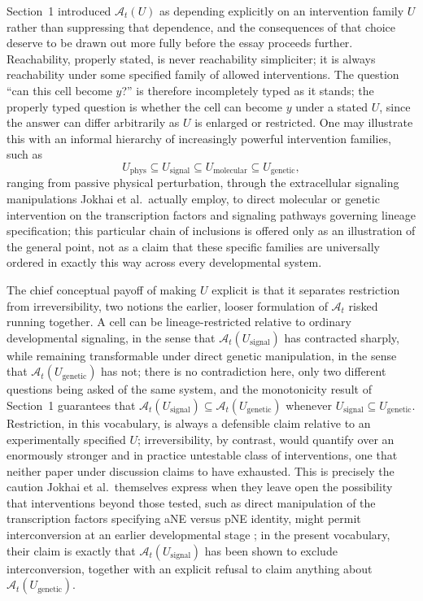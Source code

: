 \documentclass[11pt]{article}
\begin{document}
Section~1 introduced $\mathcal{A}_t(U)$ as depending explicitly on an intervention family $U$ rather than suppressing that dependence, and the consequences of that choice deserve to be drawn out more fully before the essay proceeds further. Reachability, properly stated, is never reachability simpliciter; it is always reachability under some specified family of allowed interventions. The question ``can this cell become $y$?'' is therefore incompletely typed as it stands; the properly typed question is whether the cell can become $y$ under a stated $U$, since the answer can differ arbitrarily as $U$ is enlarged or restricted. One may illustrate this with an informal hierarchy of increasingly powerful intervention families, such as
\begin{equation}
U_{\text{phys}} \subseteq U_{\text{signal}} \subseteq U_{\text{molecular}} \subseteq U_{\text{genetic}},
\end{equation}
ranging from passive physical perturbation, through the extracellular signaling manipulations Jokhai et al.\ actually employ, to direct molecular or genetic intervention on the transcription factors and signaling pathways governing lineage specification; this particular chain of inclusions is offered only as an illustration of the general point, not as a claim that these specific families are universally ordered in exactly this way across every developmental system.

The chief conceptual payoff of making $U$ explicit is that it separates restriction from irreversibility, two notions the earlier, looser formulation of $\mathcal{A}_t$ risked running together. A cell can be lineage-restricted relative to ordinary developmental signaling, in the sense that $\mathcal{A}_t(U_{\text{signal}})$ has contracted sharply, while remaining transformable under direct genetic manipulation, in the sense that $\mathcal{A}_t(U_{\text{genetic}})$ has not; there is no contradiction here, only two different questions being asked of the same system, and the monotonicity result of Section~1 guarantees that $\mathcal{A}_t(U_{\text{signal}}) \subseteq \mathcal{A}_t(U_{\text{genetic}})$ whenever $U_{\text{signal}} \subseteq U_{\text{genetic}}$. Restriction, in this vocabulary, is always a defensible claim relative to an experimentally specified $U$; irreversibility, by contrast, would quantify over an enormously stronger and in practice untestable class of interventions, one that neither paper under discussion claims to have exhausted. This is precisely the caution Jokhai et al.\ themselves express when they leave open the possibility that interventions beyond those tested, such as direct manipulation of the transcription factors specifying aNE versus pNE identity, might permit interconversion at an earlier developmental stage \cite{jokhai2026}; in the present vocabulary, their claim is exactly that $\mathcal{A}_t(U_{\text{signal}})$ has been shown to exclude interconversion, together with an explicit refusal to claim anything about $\mathcal{A}_t(U_{\text{genetic}})$.
\end{document}
